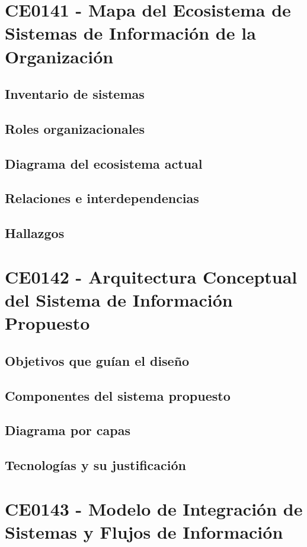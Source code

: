\chapter{CE0141 - Mapa del Ecosistema de Sistemas de Información de la Organización}

\section{Inventario de sistemas}
\section{Roles organizacionales}
\section{Diagrama del ecosistema actual}
\section{Relaciones e interdependencias}
\section{Hallazgos}

\chapter{CE0142 - Arquitectura Conceptual del Sistema de Información Propuesto}

\section{Objetivos que guían el diseño}
\section{Componentes del sistema propuesto}
\section{Diagrama por capas}
\section{Tecnologías y su justificación}

\chapter{CE0143 - Modelo de Integración de Sistemas y Flujos de Información}

